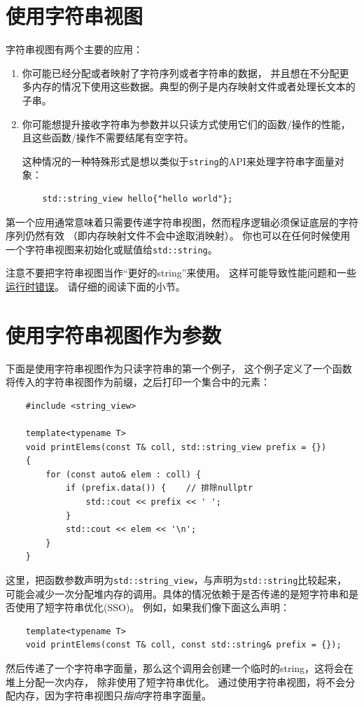 \section{使用字符串视图}
字符串视图有两个主要的应用：
\begin{enumerate}
    \item 你可能已经分配或者映射了字符序列或者字符串的数据，
    并且想在不分配更多内存的情况下使用这些数据。典型的例子是内存映射文件或者处理长文本的子串。
    \item 你可能想提升接收字符串为参数并以只读方式使用它们的函数/操作的性能，
    且这些函数/操作不需要结尾有空字符。

    这种情况的一种特殊形式是想以类似于\texttt{string}的API来处理字符串字面量对象：
    \begin{lstlisting}
    std::string_view hello{"hello world"};
    \end{lstlisting}
\end{enumerate}
第一个应用通常意味着只需要传递字符串视图，然而程序逻辑必须保证底层的字符序列仍然有效
（即内存映射文件不会中途取消映射）。
你也可以在任何时候使用一个字符串视图来初始化或赋值给\texttt{std::string}。

注意不要把字符串视图当作“更好的string”来使用。
这样可能导致性能问题和一些\hyperref[ch19.3.1]{运行时错误}。
请仔细的阅读下面的小节。


\section{使用字符串视图作为参数}
下面是使用字符串视图作为只读字符串的第一个例子，
这个例子定义了一个函数将传入的字符串视图作为前缀，之后打印一个集合中的元素：
\begin{lstlisting}
    #include <string_view>

    template<typename T>
    void printElems(const T& coll, std::string_view prefix = {})
    {
        for (const auto& elem : coll) {
            if (prefix.data()) {    // 排除nullptr
                std::cout << prefix << ' ';
            }
            std::cout << elem << '\n';
        }
    }
\end{lstlisting}
这里，把函数参数声明为\texttt{std::string\_view}，与声明为\texttt{std::string}比较起来，
可能会减少一次分配堆内存的调用。具体的情况依赖于是否传递的是短字符串和是否使用了短字符串优化(SSO)。
例如，如果我们像下面这么声明：
\begin{lstlisting}
    template<typename T>
    void printElems(const T& coll, const std::string& prefix = {});
\end{lstlisting}
然后传递了一个字符串字面量，那么这个调用会创建一个临时的string，这将会在堆上分配一次内存，
除非使用了短字符串优化。
通过使用字符串视图，将不会分配内存，因为字符串视图只\emph{指向}字符串字面量。

